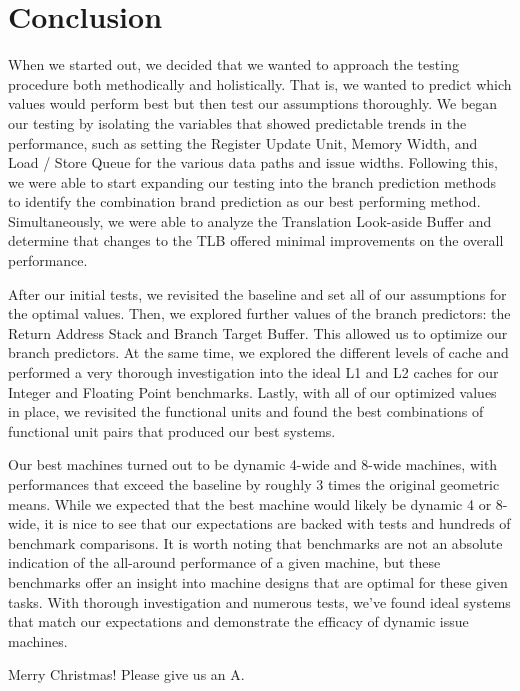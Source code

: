 \documentclass[paper=a4, fontsize=12pt]{scrartcl} %
\numberwithin{equation}{section} %
\numberwithin{figure}{section} %
\numberwithin{table}{section} %
\begin{document}
\section{Conclusion}

When we started out, we decided that we wanted to approach the testing procedure both methodically and holistically. That is, we wanted to predict which values would perform best but then test our assumptions thoroughly. We began our testing by isolating the variables that showed predictable trends in the performance, such as setting the Register Update Unit, Memory Width, and Load / Store Queue for the various data paths and issue widths. Following this, we were able to start expanding our testing into the branch prediction methods to identify the combination brand prediction as our best performing method. Simultaneously, we were able to analyze the Translation Look-aside Buffer and determine that changes to the TLB offered minimal improvements on the overall performance.

After our initial tests, we revisited the baseline and set all of our assumptions for the optimal values. Then, we explored further values of the branch predictors: the Return Address Stack and Branch Target Buffer. This allowed us to optimize our branch predictors. At the same time, we explored the different levels of cache and performed a very thorough investigation into the ideal L1 and L2 caches for our Integer and Floating Point benchmarks. Lastly, with all of our optimized values in place, we revisited the functional units and found the best combinations of functional unit pairs that produced our best systems. 

Our best machines turned out to be dynamic 4-wide and 8-wide machines, with performances that exceed the baseline by roughly 3 times the original geometric means. While we expected that the best machine would likely be dynamic 4 or 8-wide, it is nice to see that our expectations are backed with tests and hundreds of benchmark comparisons. It is worth noting that benchmarks are not an absolute indication of the all-around performance of a given machine, but these benchmarks offer an insight into machine designs that are optimal for these given tasks. With thorough investigation and numerous tests, we've found ideal systems that match our expectations and demonstrate the efficacy of dynamic issue machines.

Merry Christmas! Please give us an A.
\end{document}
